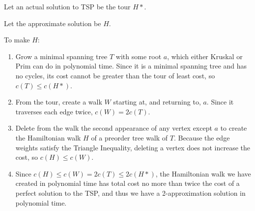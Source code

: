 \begin{description}
	Let an actual solution to TSP be the tour $H*$.  

	Let the approximate solution be $H$.  
	
	To make $H$:
	\begin{enumerate}
		\item Grow a minimal spanning tree $T$ with some root $a$, which either Kruskal or Prim can do in polynomial time.  Since it is a minimal spanning tree and has no cycles, its cost cannot be greater than the tour of least cost, so $c(T) \le c(H*)$.  
		\item From the tour, create a walk $W$ starting at, and returning to, $a$.  Since it traverses each edge twice, $c(W) = 2c(T)$.  
		\item Delete from the walk the second appearance of any vertex except $a$ to create the Hamiltonian walk $H$ of a preorder tree walk of $T$.  Because the edge weights satisfy the Triangle Inequality, deleting a vertex does not increase the cost, so $c(H) \le c(W)$.  
		\item Since $c(H) \le c(W) = 2 c(T) \le 2 c(H*)$, the Hamiltonian walk we have created in polynomial time has total cost no more than twice the cost of a perfect solution to the TSP, and thus we have a 2-approximation solution in polynomial time.  
	\end{enumerate}
		
	
\end{description}

